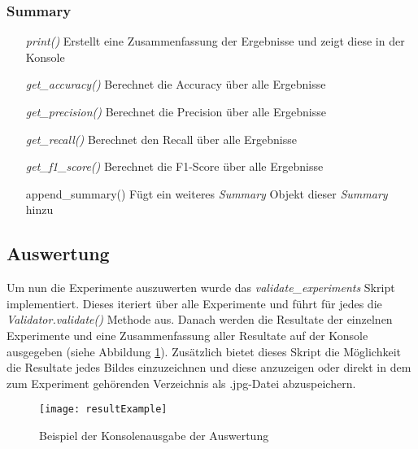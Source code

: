 \subsubsection{Summary}

\begin{itemize}[leftmargin=*,labelindent=3cm, labelsep=1cm]
	\item[\textit{print()}] Erstellt eine Zusammenfassung der Ergebnisse und zeigt diese in der Konsole
	\item[\textit{get\_accuracy()}] Berechnet die Accuracy über alle Ergebnisse
	\item[\textit{get\_precision()}] Berechnet die Precision über alle Ergebnisse
	\item[\textit{get\_recall()}] Berechnet den Recall über alle Ergebnisse
	\item[\textit{get\_f1\_score()}] Berechnet die F1-Score über alle Ergebnisse
	\item[append\_summary()] Fügt ein weiteres \textit{Summary} Objekt dieser \textit{Summary} hinzu
\end{itemize}

\subsection{Auswertung}

Um nun die Experimente auszuwerten wurde das \textit{validate\_experiments} Skript implementiert. Dieses iteriert über alle Experimente und führt für jedes die \textit{Validator.validate()} Methode aus. Danach werden die Resultate der einzelnen Experimente und eine Zusammenfassung aller Resultate auf der Konsole ausgegeben (siehe Abbildung \ref{fig:resultExample}). Zusätzlich bietet dieses Skript die Möglichkeit die Resultate jedes Bildes einzuzeichnen und diese anzuzeigen oder direkt in dem zum Experiment gehörenden Verzeichnis als .jpg-Datei abzuspeichern.\\


\begin{figure}[H]
	\centering
	\texttt{[image: resultExample]}
	\caption{Beispiel der Konsolenausgabe der Auswertung}
	\label{fig:resultExample}
\end{figure}
